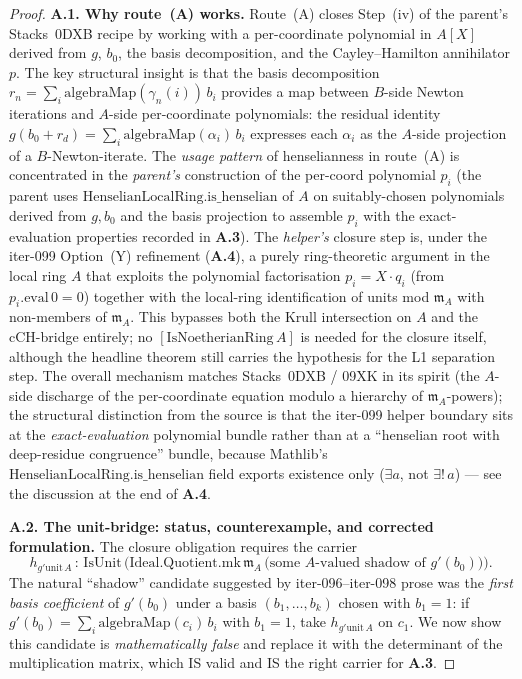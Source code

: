 \begin{proof}
\textbf{A.1. Why route~(A) works.} Route~(A) closes Step~(iv) of
the parent's Stacks~0DXB recipe by working with a per-coordinate
polynomial in $A[X]$ derived from $g$, $b_0$, the basis
decomposition, and the Cayley--Hamilton annihilator $p$. The key
structural insight is that the basis decomposition $r_n = \sum_i
\mathrm{algebraMap}(\gamma_n(i))\,b_i$ provides a map between
$B$-side Newton iterations and $A$-side per-coordinate
polynomials: the residual identity $g(b_0 + r_d) = \sum_i
\mathrm{algebraMap}(\alpha_i)\,b_i$ expresses each $\alpha_i$ as
the $A$-side projection of a $B$-Newton-iterate. The
\emph{usage pattern} of henselianness in route~(A) is concentrated
in the \emph{parent's} construction of the per-coord polynomial
$p_i$ (the parent uses $\mathrm{HenselianLocalRing.is\_henselian}$
of $A$ on suitably-chosen polynomials derived from $g, b_0$ and
the basis projection to assemble $p_i$ with the exact-evaluation
properties recorded in \textbf{A.3}). The \emph{helper's} closure
step is, under the iter-099 Option~(Y) refinement (\textbf{A.4}),
a purely ring-theoretic argument in the local ring $A$ that
exploits the polynomial factorisation $p_i = X \cdot q_i$
(from $p_i.\mathrm{eval}\,0 = 0$) together with the local-ring
identification of units mod $\mathfrak m_A$ with non-members of
$\mathfrak m_A$. This bypasses both the Krull intersection on
$A$ and the cCH-bridge entirely; no $[\mathrm{IsNoetherianRing}\,A]$
is needed for the closure itself, although the headline theorem
still carries the hypothesis for the L1 separation step. The
overall mechanism matches Stacks~0DXB / 09XK in its spirit (the
$A$-side discharge of the per-coordinate equation modulo a
hierarchy of $\mathfrak m_A$-powers); the structural distinction
from the source is that the iter-099 helper boundary sits at the
\emph{exact-evaluation} polynomial bundle rather than at a
``henselian root with deep-residue congruence'' bundle, because
Mathlib's $\mathrm{HenselianLocalRing.is\_henselian}$ field
exports existence only ($\exists a$, not $\exists!\,a$) — see the
discussion at the end of \textbf{A.4}.

\textbf{A.2. The unit-bridge: status, counterexample, and
corrected formulation.} The closure obligation requires the
carrier
\[
h_{g'\mathrm{unit}\,A}\,:\,\mathrm{IsUnit}\,
\bigl(\mathrm{Ideal.Quotient.mk}\,\mathfrak m_A\,
   \bigl(\text{some $A$-valued shadow of $g'(b_0)$}\bigr)\bigr).
\]
The natural ``shadow'' candidate suggested by iter-096--iter-098
prose was the \emph{first basis coefficient} of $g'(b_0)$ under a
basis $(b_1,\ldots,b_k)$ chosen with $b_1 = 1$: if
$g'(b_0) = \sum_i \mathrm{algebraMap}(c_i)\,b_i$ with $b_1 = 1$,
take $h_{g'\mathrm{unit}\,A}$ on $c_1$. We now show this candidate
is \emph{mathematically false} and replace it with the
determinant of the multiplication matrix, which IS valid and IS
the right carrier for \textbf{A.3}.


\end{proof}
